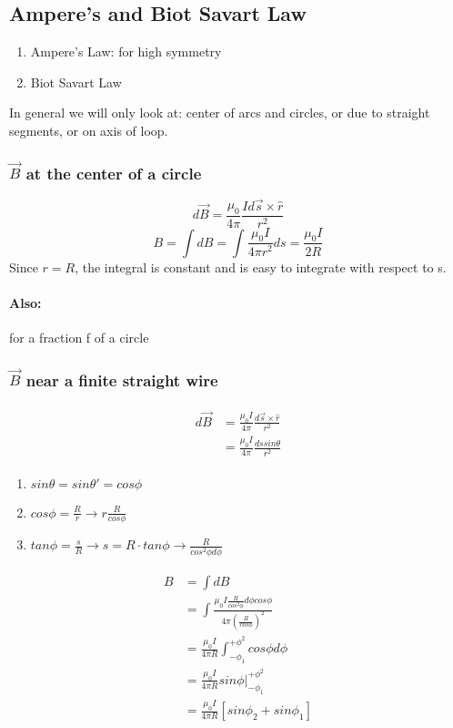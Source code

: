 \documentclass{article}
\begin{document}
    \subsection{Ampere's and Biot Savart Law}
    \begin{enumerate}
        \item Ampere's Law: for high symmetry
        \item Biot Savart Law
    \end{enumerate}
    In general we will only look at: center of arcs and circles, or due to straight segments, or on axis of loop.
    \subsubsection{$\vec{B}$ at the center of a circle}
    $$d\vec{B} = \frac{\mu_0}{4\pi}\frac{Id\vec{s}\times \hat{r}}{r^2}$$
    $$B = \int dB = \int \frac{\mu_0 I}{4 \pi r^2}ds = \frac{\mu_0 I}{2R}$$
    Since $r=R$, the integral is constant and is easy to integrate with respect to s.
    \paragraph{Also:}for a fraction f of a circle 
    
    \subsubsection{$\vec{B}$ near a finite straight wire}
   
    \begin{align*}
        \begin{split}
            d\vec{B} &= \frac{\mu_0 I}{4\pi}\frac{d\vec{s}\times \hat{r}}{r^2}\\
                &= \frac{\mu_0 I}{4\pi} \frac{ds sin\theta}{r^2}
        \end{split}
    \end{align*}

    \begin{enumerate}
        \item $sin\theta = sin\theta ' =cos\phi$
        \item $cos\phi = \frac{R}{r} \rightarrow r \frac{R}{cos\phi}$
        \item $tan\phi = \frac{s}{R} \rightarrow s =R\cdot tan\phi \rightarrow \frac{R}{cos^2\phi d\phi}$
    \end{enumerate}

    \begin{align*}
        \begin{split}
            B &= \int dB \\
            &= \int \frac{\mu_0I \frac{R}{cos^2\phi}d\phi cos\phi}{4\pi (\frac{R}{cos\phi})^2} \\
            &= \frac{\mu_0 I}{4\pi R}\int_{-\phi_1}^{+\phi^2}cos\phi d\phi \\
            &= \frac{\mu_0 I}{4\pi R}sin \phi \rvert_{-\phi_1}^{+\phi^2} \\
            &= \frac{\mu_0 I}{4\pi R}[sin \phi _2 + sin\phi _1]
        \end{split}
    \end{align*}
\end{document}
